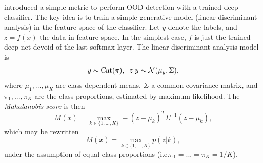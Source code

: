 {\textcite{lee_simple_2018} introduced a simple metric to perform OOD detection with a trained deep classifier. The key idea is to train a simple generative model (linear discriminant analysis) in the feature space of the classifier. Let $y$ denote the labels, and $z = f(x)$ the data in feature space. In the simplest case, $f$ is just the trained deep net devoid of the last softmax layer. The linear discriminant analysis model is
\begin{equation}
    y \sim \textup{Cat}(\pi), \; \; z | y \sim \mathcal{N}(\mu_y, \Sigma),
\end{equation}
where $\mu_1,...,\mu_K$ are class-dependent means, $\Sigma$ a common covariance matrix, and $\pi_1,...,\pi_K$ are the class proportions, estimated by maximum-likelihood. The \emph{Mahalanobis score} is then
\begin{equation}
    M(x) = \max_{k \in \{1,...,K \}} - (z - \mu_k)^T \Sigma^{-1} (z - \mu_k),
\end{equation}
which may be rewritten
\begin{equation}
    M(x) = \max_{k \in \{1,...,K \}} p(z|k),
\end{equation}
under the assumption of equal class proportions (i.e.\@ $\pi_1 = ... = \pi_K = 1/K$).

}
